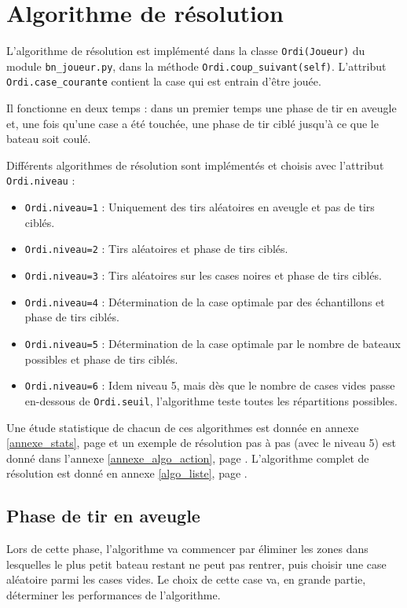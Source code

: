 \chapter{Algorithme de résolution}





L'algorithme de résolution est implémenté dans la classe \texttt{Ordi(Joueur)} du module \texttt{bn\_joueur.py}, dans la méthode \texttt{Ordi.coup\_suivant(self)}. L'attribut \texttt{Ordi.case\_courante} contient la case qui est entrain d'être jouée.

Il fonctionne en deux temps : dans un premier temps une phase de tir en aveugle et, une fois qu'une case a été touchée, une phase de tir ciblé jusqu'à ce que le bateau soit coulé.

Différents algorithmes de résolution sont implémentés et choisis avec l'attribut \texttt{Ordi.niveau} :
\begin{itemize}
\item \texttt{Ordi.niveau=1} : Uniquement des tirs aléatoires en aveugle et pas de tirs ciblés.
\item \texttt{Ordi.niveau=2} : Tirs aléatoires et phase de tirs ciblés.
\item \texttt{Ordi.niveau=3} : Tirs aléatoires sur les cases noires  et phase de tirs ciblés.
\item \texttt{Ordi.niveau=4} : Détermination de la case optimale par des échantillons et phase de tirs ciblés.
\item \texttt{Ordi.niveau=5} : Détermination de la case optimale par le nombre de bateaux possibles et phase de tirs ciblés.
\item \texttt{Ordi.niveau=6} : Idem niveau 5, mais dès que le nombre de cases vides passe en-dessous de \texttt{Ordi.seuil}, l'algorithme teste toutes les répartitions possibles.
\end{itemize}

Une étude statistique de chacun de ces algorithmes est donnée en annexe \ref{annexe_stats}, page \pageref{annexe_stats} et un exemple de résolution pas à pas (avec le niveau 5) est donné dans l'annexe \ref{annexe_algo_action}, page \pageref{annexe_algo_action}. L'algorithme complet de résolution est donné en annexe \ref{algo_liste}, page \pageref{algo_resolution}.




\section{Phase de tir en aveugle}
Lors de cette phase, l'algorithme va commencer par éliminer les zones dans lesquelles le plus petit bateau restant ne peut pas rentrer, puis choisir une case aléatoire parmi les cases vides. Le choix de cette case va, en grande partie, déterminer les performances de l'algorithme.

